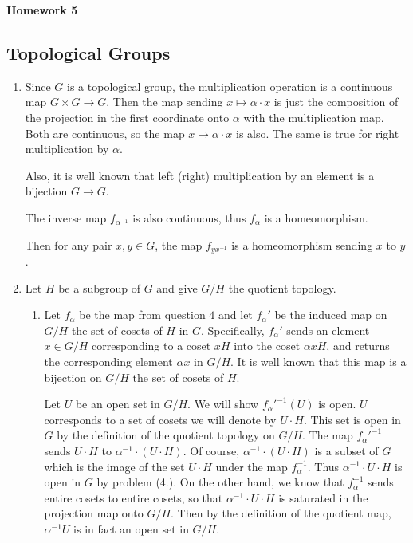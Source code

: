 \documentclass[11pt, reqno]{article}
\theoremstyle{plain}
\theoremstyle{definition}
\theoremstyle{remark}
\begin{document}
\topmargin=-40pt
\renewcommand{\headrulewidth}{1pt}
\renewcommand{\headsep}{20pt}
\thispagestyle{fancy}

{\Huge \bfseries \noindent Homework 5}

\subsection*{Topological Groups}

\begin{enumerate}
    \item[4.] Since $G$ is a topological group, the multiplication operation is a continuous
    map $G\times G \rightarrow G$. Then the map sending $x \mapsto \alpha\cdot x$ is just the 
    composition of the projection in the first coordinate onto $\alpha$ with the multiplication
    map. Both are continuous, so the map $x \mapsto \alpha \cdot x$ is also. The same is true 
    for right multiplication by $\alpha$.

    Also, it is well known that left (right) multiplication by an element is a bijection $G \rightarrow G$.

    The inverse map $f_{\alpha^{-1}}$ is also continuous, thus $f_{\alpha}$ is a homeomorphism. 

    Then for any pair $x, y \in G$, the map $f_{yx^{-1}}$ is a homeomorphism sending $x$ to $y$.

    \item[5.] Let $H$ be a subgroup of $G$ and give $G/H$ the quotient topology. 
    \begin{enumerate}
        \item Let $f_\alpha$ be the map from question $4$ and let $f_\alpha'$ be the induced map on
        $G/H$ the set of cosets of $H$ in $G$. Specifically, $f_\alpha'$ sends an element $x \in G/H$
        corresponding to a coset $xH$ into the coset $\alpha xH$, and returns the corresponding
        element $\alpha x$ in $G/H$. It is well known that this map is a 
        bijection on $G/H$ the set of cosets of $H$.

        Let $U$ be an open set in $G/H$. We will show $f_\alpha'^{-1}(U)$ is open. 
        $U$ corresponds to a set of cosets we will denote by $U\cdot H$. This 
        set is open in $G$ by the definition of the quotient topology on $G/H$. The map 
        $f_\alpha'^{-1}$ sends $U\cdot H$ to $\alpha^{-1}\cdot (U\cdot H)$. Of course, $\alpha^{-1}\cdot(U\cdot H)$ is a subset of $G$ which is the image of 
        the set $U\cdot H$ under the map $f_\alpha^{-1}$. Thus $\alpha^{-1}\cdot U\cdot H$ is open in $G$ by problem (4.). On the other hand, 
        we know that $f_\alpha^{-1}$ sends entire cosets to entire cosets, so that $\alpha^{-1}\cdot U\cdot H$ is saturated in the 
        projection map onto $G/H$. Then by the definition of the quotient map, $\alpha^{-1} U$ is in fact an open set in 
        $G/H$.


\end{enumerate}
\end{enumerate}
\end{document}
